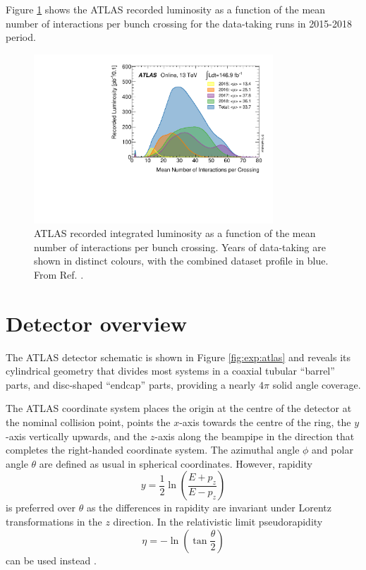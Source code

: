 Figure \ref{fig:exp:pileup} shows the ATLAS recorded luminosity as a
function of the mean number of interactions per bunch crossing for
the data-taking runs in 2015-2018 period.

\begin{figure}[h]
  \centering
  \includegraphics[width=0.8\textwidth]{figures/experiment/pileup}
  \caption[Mean number of interactions per bunch crossing]{ATLAS recorded
  integrated luminosity as a function of the mean number
  of interactions per bunch crossing. Years of data-taking
  are shown in distinct colours, with the combined dataset profile in blue.
  From Ref. \cite{pileup}.}
  \label{fig:exp:pileup}
\end{figure}

\section{Detector overview}

The ATLAS detector schematic is shown in Figure \ref{fig:exp:atlas} and
reveals its cylindrical geometry that divides most systems in a coaxial 
tubular ``barrel'' parts, and disc-shaped ``endcap'' parts, providing
a nearly $4\pi$ solid angle coverage.

The ATLAS coordinate system places
the origin at the centre of the detector at the nominal collision point,
points the $x$-axis towards the centre of the ring, the $y$-axis vertically
upwards, and the $z$-axis along the beampipe in the direction that
completes the right-handed coordinate system. The azimuthal angle $\phi$
and polar angle $\theta$ are defined as usual in spherical coordinates.
However, rapidity
\begin{equation}
y = \frac{1}{2}\ln{\left( \frac{E+p_z}{E-p_z}\right)}
\end{equation}
is preferred over $\theta$ as the differences in rapidity are invariant
under Lorentz transformations in the $z$ direction. In the relativistic
limit pseudorapidity
\begin{equation}
\eta = - \ln{\left(\tan{\frac{\theta}{2}}\right)}
\end{equation}
can be used instead \cite{Thomson:2013zua}.

